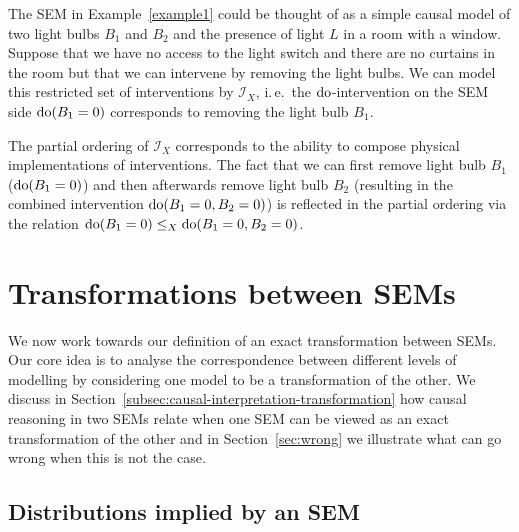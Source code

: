 The SEM in Example~\ref{example1} could be thought of as a simple causal model of two light bulbs $B_1$ and $B_2$ and the presence of light $L$ in a room with a window.
Suppose that we have no access to the light switch and there are no curtains in the room but that we can intervene by removing the light bulbs.
We can model this restricted set of interventions by $\mathcal{I}_X$, i.\,e.\ the $\operatorname{do}$-intervention on the SEM side ${\operatorname{do}(B_1=0)}$  corresponds to removing the light bulb $B_1$.

The partial ordering of $\mathcal{I}_X$ corresponds to the ability to compose physical implementations of interventions. The fact that we can first remove light bulb $B_1$ (${\operatorname{do}(B_1=0)}$) and then afterwards remove light bulb $B_2$ (resulting in the combined intervention ${\operatorname{do}(B_1=0, B_2=0)}$)  is reflected in the partial ordering via the relation ${\operatorname{do}(B_1=0) \leq_X \operatorname{do}(B_1=0,B_2=0)}$.
%

\section{Transformations between SEMs}\label{sec:sem-transformation}

We now work towards our definition of an exact transformation between SEMs\@.
Our core idea is to analyse the correspondence between different levels of modelling by considering one model to be a transformation of the other.
We discuss in Section~\ref{subsec:causal-interpretation-transformation} how causal reasoning in two SEMs relate when one SEM can be viewed as an exact transformation of the other and in Section~\ref{sec:wrong} we illustrate what can go wrong when this is not the case.

\subsection{Distributions implied by an SEM}

